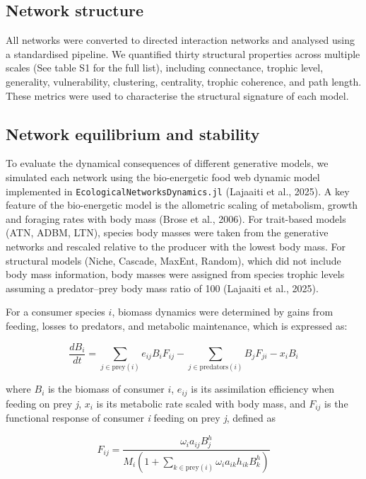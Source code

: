 \documentclass[
]{article}
\begin{document}
\subsection{Network structure}\label{network-structure}

All networks were converted to directed interaction networks and
analysed using a standardised pipeline. We quantified thirty structural
properties across multiple scales (See table S1 for the full list),
including connectance, trophic level, generality, vulnerability,
clustering, centrality, trophic coherence, and path length. These
metrics were used to characterise the structural signature of each
model.

\subsection{Network equilibrium and
stability}\label{network-equilibrium-and-stability}

To evaluate the dynamical consequences of different generative models,
we simulated each network using the bio-energetic food web dynamic model
implemented in \texttt{EcologicalNetworksDynamics.jl} (Lajaaiti et al.,
2025). A key feature of the bio-energetic model is the allometric
scaling of metabolism, growth and foraging rates with body mass (Brose
et al., 2006). For trait-based models (ATN, ADBM, LTN), species body
masses were taken from the generative networks and rescaled relative to
the producer with the lowest body mass. For structural models (Niche,
Cascade, MaxEnt, Random), which did not include body mass information,
body masses were assigned from species trophic levels assuming a
predator--prey body mass ratio of 100 (Lajaaiti et al., 2025).

For a consumer species \(i\), biomass dynamics were determined by gains
from feeding, losses to predators, and metabolic maintenance, which is
expressed as:

\[\frac{dB_i}{dt} = \sum_{j \in \mathrm{prey}(i)}e_{ij} B_i F_{ij} - \sum_{j \in \mathrm{predators}(i)} B_j F_{ji} - x_i B_i\]

where \(B_i\) is the biomass of consumer \(i\), \(e_{ij}\) is its
assimilation efficiency when feeding on prey \emph{j}, \(x_i\) is its
metabolic rate scaled with body mass, and \(F_{ij}\) is the functional
response of consumer \emph{i} feeding on prey \emph{j}, defined as

\[F_{ij} = \frac{\omega_{i} a_{ij} B_j^{h}} {M_i\left (1 + \displaystyle\sum_{k \in \mathrm{prey}(i)} \omega_{i} a_{ik} h_{ik} B_k^{h} \right)}\]
\end{document}
